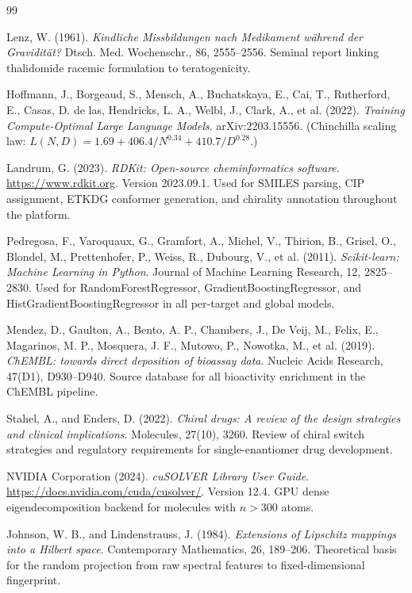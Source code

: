 \documentclass[11pt,a4paper]{article}
\begin{document}
\begin{thebibliography}{99}

Lenz, W. (1961).
\textit{Kindliche Missbildungen nach Medikament w\"{a}hrend der Gravidit\"{a}t?}
Dtsch. Med. Wochenschr., 86, 2555--2556.
Seminal report linking thalidomide racemic formulation to teratogenicity.

Hoffmann, J., Borgeaud, S., Mensch, A., Buchatskaya, E., Cai, T., Rutherford, E.,
Casas, D. de las, Hendricks, L. A., Welbl, J., Clark, A., et al. (2022).
\textit{Training Compute-Optimal Large Language Models}.
arXiv:2203.15556. (Chinchilla scaling law: $L(N,D) = 1.69 + 406.4/N^{0.34} + 410.7/D^{0.28}$.)

Landrum, G. (2023).
\textit{RDKit: Open-source cheminformatics software}.
\url{https://www.rdkit.org}. Version 2023.09.1.
Used for SMILES parsing, CIP assignment, ETKDG conformer generation, and
chirality annotation throughout the platform.

Pedregosa, F., Varoquaux, G., Gramfort, A., Michel, V., Thirion, B., Grisel, O.,
Blondel, M., Prettenhofer, P., Weiss, R., Dubourg, V., et al. (2011).
\textit{Scikit-learn: Machine Learning in Python}.
Journal of Machine Learning Research, 12, 2825--2830.
Used for RandomForestRegressor, GradientBoostingRegressor, and
HistGradientBoostingRegressor in all per-target and global models.

Mendez, D., Gaulton, A., Bento, A. P., Chambers, J., De Veij, M., Felix, E.,
Magarinos, M. P., Mosquera, J. F., Mutowo, P., Nowotka, M., et al. (2019).
\textit{ChEMBL: towards direct deposition of bioassay data}.
Nucleic Acids Research, 47(D1), D930--D940.
Source database for all bioactivity enrichment in the ChEMBL pipeline.

Stahel, A., and Enders, D. (2022).
\textit{Chiral drugs: A review of the design strategies and clinical implications}.
Molecules, 27(10), 3260.
Review of chiral switch strategies and regulatory requirements for
single-enantiomer drug development.

NVIDIA Corporation (2024).
\textit{cuSOLVER Library User Guide}.
\url{https://docs.nvidia.com/cuda/cusolver/}. Version 12.4.
GPU dense eigendecomposition backend for molecules with $n > 300$ atoms.

Johnson, W. B., and Lindenstrauss, J. (1984).
\textit{Extensions of Lipschitz mappings into a Hilbert space}.
Contemporary Mathematics, 26, 189--206.
Theoretical basis for the random projection from raw spectral features to
fixed-dimensional fingerprint.

\end{thebibliography}
\end{document}
